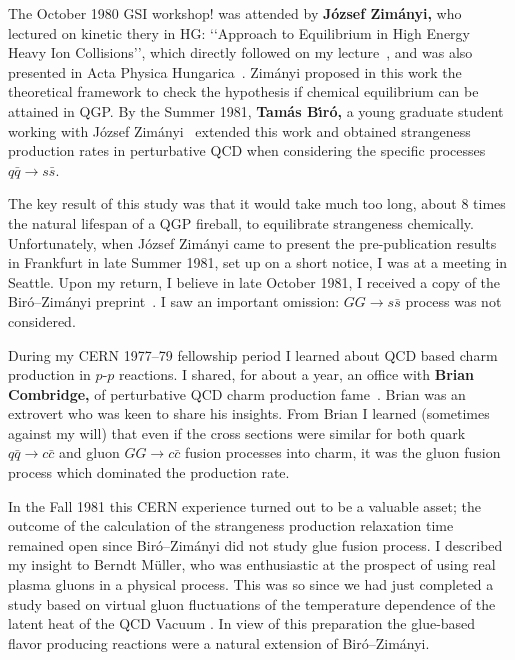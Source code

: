 The October 1980 GSI workshop!\cite{Bock:1980GSI} was attended by \textbf{J\'ozsef Zim\'anyi,} who lectured on kinetic thery in HG: \lq\lq Approach to Equilibrium in High Energy Heavy Ion Collisions\rq\rq, which directly followed on my lecture~\cite{Rafelski:1980fy}, and was also presented in Acta Physica Hungarica~\cite{Zimanyi:1980fz}. Zim\'anyi proposed in this work the theoretical framework to check the hypothesis if chemical equilibrium can be attained in QGP. By the Summer 1981, \textbf{Tam\'as B\'{\i}r\'o,} a young graduate student working with J\'ozsef Zim\'anyi~\cite{Biro:1981zi} extended this work and obtained strangeness production rates in perturbative QCD when considering the specific processes $q\bar q\to s\bar s$. 
 
The key result of this study was that it would take much too long, about 8 times the natural lifespan of a QGP fireball, to equilibrate strangeness chemically. Unfortunately, when J\'ozsef Zim\'anyi came to present the pre-publication results in Frankfurt in late Summer 1981, set up on a short notice, I was at a meeting in Seattle. Upon my return, I believe in late October 1981, I received a copy of the Bir\'o--Zim\'anyi preprint~\cite{Biro:1981zi}. I saw an important omission: $GG\to s\bar s$ process was not considered.

During my CERN 1977--79 fellowship period I learned about QCD based charm production in $p$-$p$ reactions. I shared, for about a year, an office with \textbf{Brian Combridge,} of perturbative QCD charm production fame~\cite{Combridge:1978kx}. Brian was an extrovert who was keen to share his insights. From Brian I learned (sometimes against my will) that even if the cross sections were similar for both quark $q\bar q\to c\bar c$ and gluon $GG\to c\bar c$ fusion processes into charm, it was the gluon fusion process which dominated the production rate. 

In the Fall 1981 this CERN experience turned out to be a valuable asset; the outcome of the calculation of the strangeness production relaxation time remained open since Bir\'o--Zim\'anyi did not study glue fusion process. I described my insight to Berndt M\"uller, who was enthusiastic at the prospect of using real plasma gluons in a physical process. This was so since we had just completed a study based on virtual gluon fluctuations of the temperature dependence of the latent heat of the QCD Vacuum \cite{Muller:1980kf}. In view of this preparation the glue-based flavor producing reactions were a natural extension of Bir\'o--Zim\'anyi.

